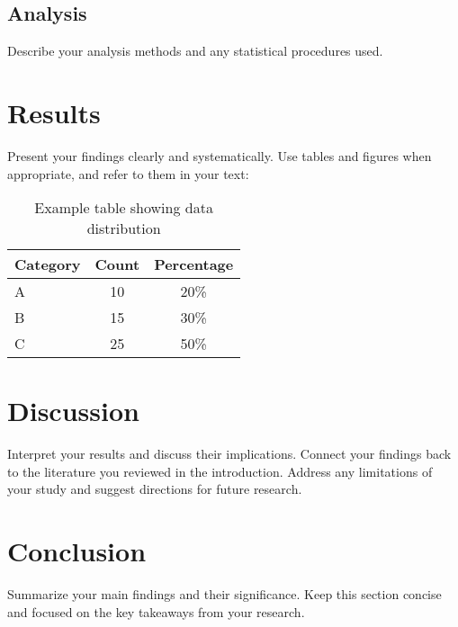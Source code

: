 \documentclass[12pt, titlepage]{article}
\begin{document}
  \subsection{Analysis}
    Describe your analysis methods and any statistical procedures used.

\section{Results}
  Present your findings clearly and systematically. Use tables and figures when 
  appropriate, and refer to them in your text:

  \begin{table}[ht]
    \centering
    \begin{tabular}{lcc}
      \hline
      Category & Count & Percentage \\
      \hline
      A & 10 & 20\% \\
      B & 15 & 30\% \\
      C & 25 & 50\% \\
      \hline
    \end{tabular}
    \caption{Example table showing data distribution}
    \label{tab:distribution}
  \end{table}

\section{Discussion}
  Interpret your results and discuss their implications. Connect your findings 
  back to the literature you reviewed in the introduction. Address any 
  limitations of your study and suggest directions for future research.

\section{Conclusion}
  Summarize your main findings and their significance. Keep this section concise 
  and focused on the key takeaways from your research.

\singlespacing  %


\end{document}
